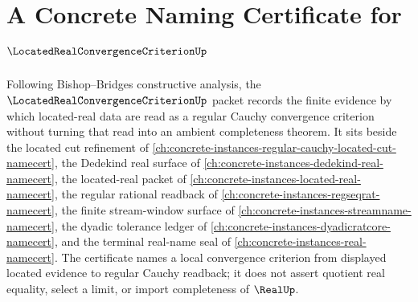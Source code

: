 \chapter{A Concrete Naming Certificate for $\LocatedRealConvergenceCriterionUp$}
\label{ch:concrete-instances-located-real-convergence-criterion-namecert}

Following Bishop--Bridges constructive analysis, the $\LocatedRealConvergenceCriterionUp$ packet records the finite evidence by which located-real data are read as a regular Cauchy convergence criterion without turning that read into an ambient completeness theorem. It sits beside the located cut refinement of \autoref{ch:concrete-instances-regular-cauchy-located-cut-namecert}, the Dedekind real surface of \autoref{ch:concrete-instances-dedekind-real-namecert}, the located-real packet of \autoref{ch:concrete-instances-located-real-namecert}, the regular rational readback of \autoref{ch:concrete-instances-regseqrat-namecert}, the finite stream-window surface of \autoref{ch:concrete-instances-streamname-namecert}, the dyadic tolerance ledger of \autoref{ch:concrete-instances-dyadicratcore-namecert}, and the terminal real-name seal of \autoref{ch:concrete-instances-real-namecert}. The certificate names a local convergence criterion from displayed located evidence to regular Cauchy readback; it does not assert quotient real equality, select a limit, or import completeness of $\RealUp$.

